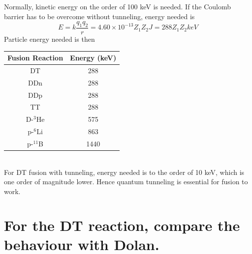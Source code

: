 \documentclass[answers]{exam}
\begin{document}
\begin{questions}
\begin{parts}
\begin{solution}
    Normally, kinetic energy on the order of 100 keV is needed. If the Coulomb barrier has to be overcome without tunneling, energy needed is
    $$E = k\frac{q_1q_2}{r} = 4.60 \times 10^{-13} Z_1Z_2 \unit{J} = 288 Z_1Z_2 \unit{keV}$$
    Particle energy needed is then \\
    \begin{tabular}{c c}
            \hline
            Fusion Reaction & Energy (keV) \\
            \hline
            DT & 288 \\
            \hline
            DDn & 288 \\
            \hline
            DDp & 288 \\
            \hline
            TT & 288 \\
            \hline
            D-$^3$He & 575 \\
            \hline
            p-$^6$Li & 863 \\
            \hline
            p-$^{11}$B & 1440 \\
            \hline
    \end{tabular} \\
    For DT fusion with tunneling, energy needed is to the order of 10 keV, which is one order of magnitude lower. Hence quantum tunneling is essential for fusion to work.
\end{solution}

\part{For the DT reaction, compare the behaviour with Dolan.}


\end{parts}
\end{questions}
\end{document}
